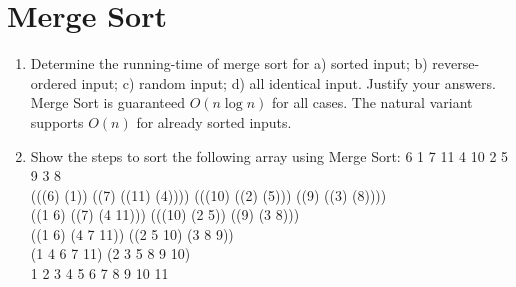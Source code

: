 \documentclass[11pt]{article}
\begin{document}
    \section{Merge Sort} 
    \begin{enumerate}
    
        \item Determine the running-time of merge sort for a) sorted input; b) reverse-ordered input; c) random input; d) all identical input. Justify your answers.\\
       Merge Sort is guaranteed  $O(n \log n)$ for all cases. The natural variant supports $O(n)$ for already sorted inputs.
       \item Show the steps to sort the following array using Merge Sort: 6 1 7 11 4 10 2 5 9 3 8\\
       (((6) (1)) ((7) ((11) (4)))) (((10) ((2) (5))) ((9) ((3) (8))))\\
((1 6) ((7) (4 11))) (((10) (2 5)) ((9) (3 8)))\\
((1 6) (4 7 11)) ((2 5 10) (3 8 9))\\
(1 4 6 7 11) (2 3 5 8 9 10)\\
1 2 3 4 5 6 7 8 9 10 11
    \end{enumerate}
\end{document}
